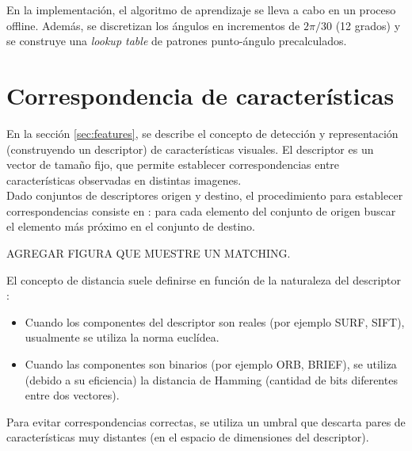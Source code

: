 \begin{subsection}
\begin{subsection}
\begin{subsection}
\begin{enumerate}
\end{enumerate}

En la implementación, el algoritmo de aprendizaje se lleva a cabo en un proceso offline. Además, se discretizan los ángulos en incrementos de $2\pi/30$ (12 grados) y se construye una \textit{\textsl{lookup table}} de patrones punto-ángulo precalculados.

\end{subsection}
\end{subsection}

\end{subsection}
\section{Correspondencia de características}

En la sección \ref{sec:features}, se describe el concepto de detección y representación (construyendo un descriptor) de características visuales. El descriptor es un vector de tamaño fijo, que permite establecer correspondencias entre características observadas en distintas imagenes. \\
Dado conjuntos de descriptores origen y destino, el procedimiento para establecer correspondencias consiste en : para cada elemento del conjunto de origen buscar el elemento más próximo en el conjunto de destino. 

AGREGAR FIGURA QUE MUESTRE UN MATCHING.

El concepto de distancia suele definirse en función de la naturaleza del descriptor :
\begin{itemize}

\item Cuando los componentes del descriptor son reales (por ejemplo SURF, SIFT), usualmente se utiliza la norma euclídea.

\item Cuando las componentes son binarios (por ejemplo ORB, BRIEF), se utiliza (debido a su eficiencia) la distancia de Hamming (cantidad de bits diferentes entre dos vectores).

\end{itemize}

Para evitar correspondencias correctas, se utiliza un umbral que descarta pares de características muy distantes (en el espacio de dimensiones del descriptor). \\

